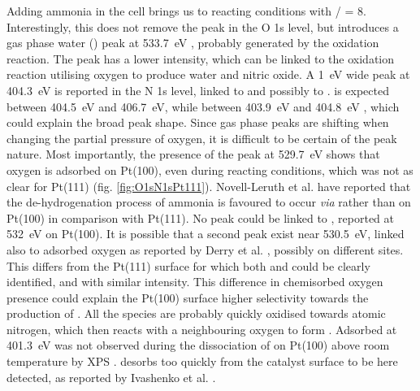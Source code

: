 Adding ammonia in the cell brings us to reacting conditions with / = \num{8}.
Interestingly, this does not remove the  peak in the O 1s level, but introduces a gas phase water () peak at \qty{533.7}{\eV} \parencite{Weststrate2006, Linford2019}, probably generated by the oxidation reaction.
The  peak has a lower intensity, which can be linked to the oxidation reaction utilising oxygen to produce water and nitric oxide.
A \qty{1}{\eV} wide peak at \qty{404.3}{\eV} is reported in the N 1s level, linked to  and possibly to .
 is expected between \qty{404.5}{\eV} and \qty{406.7}{\eV}, while  between \qty{403.9}{\eV} and \qty{404.8}{\eV} \parencite{Ivashenko2021}, which could explain the broad peak shape.
Since gas phase peaks are shifting when changing the partial pressure of oxygen, it is difficult to be certain of the peak nature.
Most importantly, the presence of the peak at \qty{529.7}{\eV} shows that oxygen is adsorbed on Pt(100), even during reacting conditions, which was not as clear for Pt(111) (fig. \ref{fig:O1sN1sPt111}).
Novell-Leruth et al. \parencite*{NovellLeruth2008} have reported that the de-hydrogenation process of ammonia is favoured to occur \textit{via}  rather than  on Pt(100) in comparison with Pt(111).
No peak could be linked to , reported at \qty{532}{\eV} on Pt(100).
It is possible that a second peak exist near \qty{530.5}{\eV}, linked also to adsorbed oxygen as reported by Derry et al. \parencite*{Derry1984}, possibly on different sites.
This differs from the Pt(111) surface for which both  and  could be clearly identified, and with similar intensity.
This difference in chemisorbed oxygen presence could explain the Pt(100) surface higher selectivity towards the production of .
All the  species are probably quickly oxidised towards atomic nitrogen, which then reacts with a neighbouring oxygen to form .
Adsorbed  at \qty{401.3}{\eV} was not observed during the dissociation of  on Pt(100) above room temperature by XPS \parencite{Rienks2003}.
 desorbs too quickly from the catalyst surface to be here detected, as reported by Ivashenko et al. \parencite*{Ivashenko2021}.

